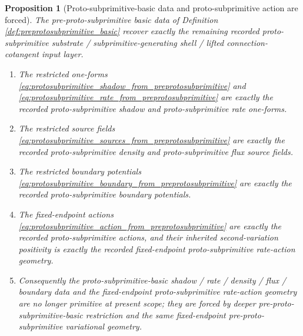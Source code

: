 \documentclass[11pt]{article}
\newtheorem{proposition}{Proposition}
\begin{document}
\begin{proposition}[Proto-subprimitive-basic data and proto-subprimitive action are forced]
\label{prop:protosubprimitive_basic_forced}
The pre-proto-subprimitive basic data of Definition \ref{def:preprotosubprimitive_basic} recover exactly the remaining recorded proto-subprimitive substrate / subprimitive-generating shell / lifted connection-cotangent input layer.
\begin{enumerate}
    \item The restricted one-forms \eqref{eq:protosubprimitive_shadow_from_preprotosubprimitive} and \eqref{eq:protosubprimitive_rate_from_preprotosubprimitive} are exactly the recorded proto-subprimitive shadow and proto-subprimitive rate one-forms.
    \item The restricted source fields \eqref{eq:protosubprimitive_sources_from_preprotosubprimitive} are exactly the recorded proto-subprimitive density and proto-subprimitive flux source fields.
    \item The restricted boundary potentials \eqref{eq:protosubprimitive_boundary_from_preprotosubprimitive} are exactly the recorded proto-subprimitive boundary potentials.
    \item The fixed-endpoint actions \eqref{eq:protosubprimitive_action_from_preprotosubprimitive} are exactly the recorded proto-subprimitive actions, and their inherited second-variation positivity is exactly the recorded fixed-endpoint proto-subprimitive rate-action geometry.
    \item Consequently the proto-subprimitive-basic shadow / rate / density / flux / boundary data and the fixed-endpoint proto-subprimitive rate-action geometry are no longer primitive at present scope; they are forced by deeper pre-proto-subprimitive-basic restriction and the same fixed-endpoint pre-proto-subprimitive variational geometry.
\end{enumerate}
\end{proposition}
\end{document}
